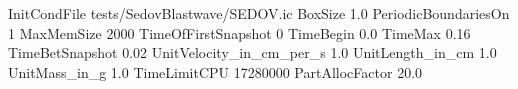 InitCondFile    tests/SedovBlastwave/SEDOV.ic
BoxSize    1.0
PeriodicBoundariesOn    1
MaxMemSize    2000
TimeOfFirstSnapshot    0
TimeBegin    0.0
TimeMax    0.16
TimeBetSnapshot    0.02
UnitVelocity_in_cm_per_s    1.0
UnitLength_in_cm    1.0
UnitMass_in_g    1.0
TimeLimitCPU    17280000
PartAllocFactor    20.0
